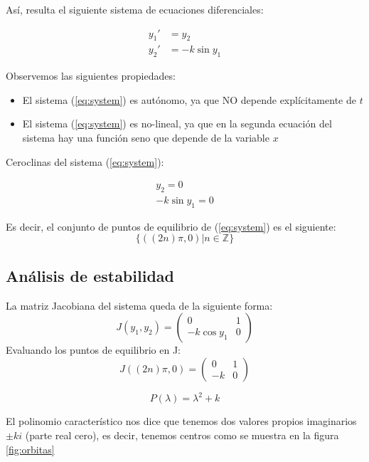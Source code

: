 \documentclass[10pt,letterpaper,titlepage]{article}
\begin{document}
As\'i, resulta el siguiente sistema de ecuaciones diferenciales:

\begin{equation}\label{eq:system}
	\begin{split}
		y_{1}' & = y_{2}\\
		y_{2}' & = -k\sin y_{1}
	\end{split}
\end{equation}

Observemos las siguientes propiedades:
\begin{itemize}
	\item El sistema (\ref{eq:system}) es aut\'onomo, ya que NO depende expl\'icitamente de $t$
	\item El sistema (\ref{eq:system}) es no-lineal, ya que en la segunda ecuaci\'on del sistema hay una funci\'on seno que depende de la variable $x$
\end{itemize}

Ceroclinas del sistema (\ref{eq:system}):

\begin{equation}
	\begin{split}
		y_{2} = 0\\
		-k\sin y_{1} = 0
	\end{split}
\end{equation}

Es decir, el conjunto de puntos de equilibrio de (\ref{eq:system}) es el siguiente:
\begin{equation}
	\{((2n) \pi, 0) | n \in \mathbb{Z}\}
\end{equation}

\subsection{An\'alisis de estabilidad}
La matriz Jacobiana del sistema queda de la siguiente forma:
\[
	J(y_{1},y_{2}) = \begin{pmatrix}
		0 & 1\\
		-k \cos y_{1} & 0
	\end{pmatrix}
\]
Evaluando los puntos de equilibrio en J:
\[
	J((2n) \pi,0) = \begin{pmatrix}
		0 & 1\\
		-k & 0
	\end{pmatrix}
\]

\begin{equation}
	P(\lambda) = \lambda ^{2} + k
\end{equation}

El polinomio caracter\'istico nos dice que tenemos dos valores propios imaginarios $\pm ki$ (parte real cero), es decir, tenemos centros como se muestra en la figura \ref{fig:orbitas}
\end{document}
